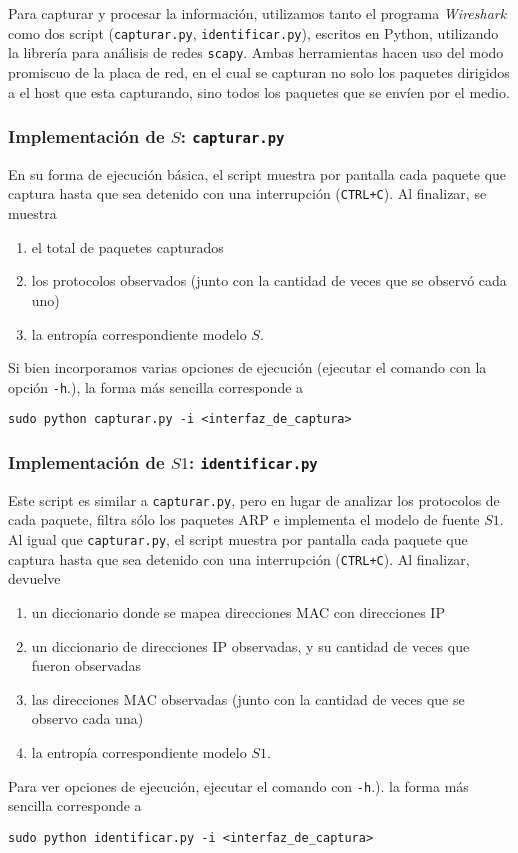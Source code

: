 Para capturar y procesar la información, utilizamos tanto el programa \textit{Wireshark} como dos script (\texttt{capturar.py}, \texttt{identificar.py}), escritos en Python, utilizando la librería para análisis de redes \texttt{scapy}. Ambas herramientas hacen uso del modo promiscuo de la placa de red, en el cual se capturan no solo los paquetes dirigidos a el host que esta capturando, sino todos los paquetes que se envíen por el medio.

\subsubsection{Implementación de $S$: \texttt{capturar.py}}
En su forma de ejecución básica, el script muestra por pantalla cada paquete que captura hasta que sea detenido con una interrupción (\texttt{CTRL+C}). Al finalizar, se muestra 
\begin{enumerate}
	\item el total de paquetes capturados
	\item los protocolos observados (junto con la cantidad de veces que se observó cada uno)
	\item la entropía correspondiente modelo $S$. 
\end{enumerate}
Si bien incorporamos varias opciones de ejecución (ejecutar el comando con la opción \texttt{-h}.), la forma más sencilla corresponde a 
\begin{verbatim}
sudo python capturar.py -i <interfaz_de_captura>
\end{verbatim}

\subsubsection{Implementación de $S1$: \texttt{identificar.py}}
Este script es similar a \texttt{capturar.py}, pero en lugar de analizar los protocolos de cada paquete, filtra sólo los paquetes ARP e implementa el modelo de fuente $S1$. Al igual que \texttt{capturar.py}, el script muestra por pantalla cada paquete que captura hasta que sea detenido con una interrupción (\texttt{CTRL+C}). Al finalizar, devuelve
\begin{enumerate}
	\item un diccionario donde se mapea direcciones MAC con direcciones IP
	\item un diccionario de direcciones IP observadas, y su cantidad de veces que fueron observadas
	\item las direcciones MAC observadas (junto con la cantidad de veces que se observo cada una)
	\item la entropía correspondiente modelo $S1$. 
\end{enumerate}
Para ver opciones de ejecución, ejecutar el comando con \texttt{-h}.). la forma más sencilla corresponde a 
\begin{verbatim}
sudo python identificar.py -i <interfaz_de_captura>
\end{verbatim}
